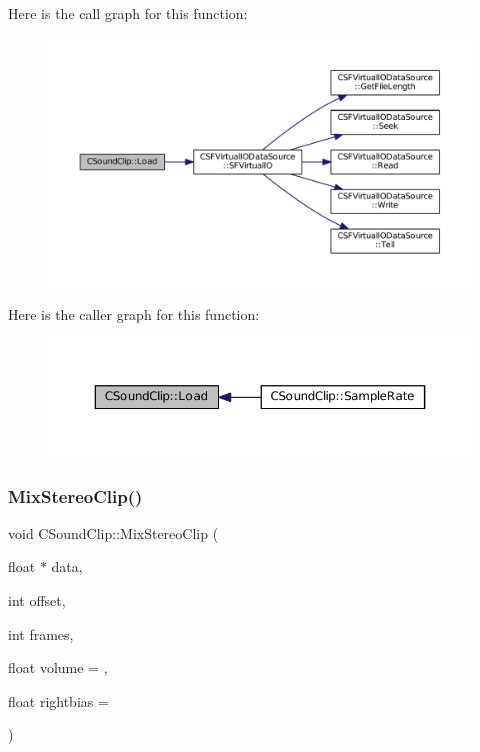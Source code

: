 Here is the call graph for this function\+:\nopagebreak
\begin{figure}[H]
\begin{center}
\leavevmode
\includegraphics[width=350pt]{classCSoundClip_a4b8a88d0062844969cbe1ab763c3590a_cgraph}
\end{center}
\end{figure}
Here is the caller graph for this function\+:\nopagebreak
\begin{figure}[H]
\begin{center}
\leavevmode
\includegraphics[width=350pt]{classCSoundClip_a4b8a88d0062844969cbe1ab763c3590a_icgraph}
\end{center}
\end{figure}
\hypertarget{classCSoundClip_a54fb05ee6936503af55650b10c861967}{}\label{classCSoundClip_a54fb05ee6936503af55650b10c861967} 
\subsubsection{\texorpdfstring{Mix\+Stereo\+Clip()}{MixStereoClip()}}
{\footnotesize\ttfamily void C\+Sound\+Clip\+::\+Mix\+Stereo\+Clip (\begin{DoxyParamCaption}\item[{float $\ast$}]{data,  }\item[{int}]{offset,  }\item[{int}]{frames,  }\item[{float}]{volume = {},  }\item[{float}]{rightbias = {} }\end{DoxyParamCaption})}



